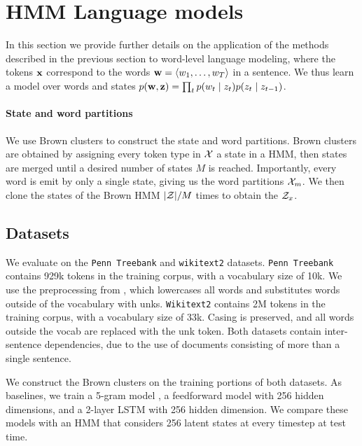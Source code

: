 \documentclass[11pt,a4paper]{article}
\begin{document}


\section{HMM Language models}
\label{sec:experiments}
In this section we provide further details on the application
of the methods described in the previous section
to word-level language modeling,
where the tokens $\mathbf{x}$ correspond to the words
$\mathbf{w} = \langle w_1,\ldots,w_T \rangle$ in a sentence.
We thus learn a model over words and states
$p(\mathbf{w},\mathbf{z}) = \prod_t p(w_t\mid z_t)p(z_t \mid z_{t-1})$.

\paragraph{State and word partitions}
We use Brown clusters \citep{brown1992,liang2005brown} to construct the state and word partitions.
Brown clusters are obtained by assigning every token type in $\mathcal{X}$ a state in a HMM,
then states are merged until a desired number of states $M$ is reached.
Importantly, every word is emit by only a single state, giving us the 
word partitions $\mathcal{X}_m$.
We then clone the states of the Brown HMM $|\mathcal{Z}|/M$ times to obtain the $\mathcal{Z}_x$.

\subsection{Datasets}
We evaluate on the \texttt{Penn Treebank} \citep{ptb}
and \texttt{wikitext2} \citep{wikitext} datasets.
\texttt{Penn Treebank} contains 929k tokens in the training corpus,
with a vocabulary size of 10k.
We use the preprocessing from \citet{mikolov-2011},
which lowercases all words and substitutes words outside of the vocabulary
with unks. 
\texttt{Wikitext2} contains 2M tokens in the training corpus,
with a vocabulary size of 33k.
Casing is preserved, and all words outside the vocab are replaced with the unk token.
Both datasets contain inter-sentence dependencies,
due to the use of documents consisting of more than a single sentence.

We construct the Brown clusters on the training portions of both datasets.
As baselines, we train a 5-gram model \citep{kenlm},
a feedforward model with 256 hidden dimensions,
and a 2-layer LSTM with 256 hidden dimension.
We compare these models with an HMM that considers 256 latent states
at every timestep at test time.
\end{document}
